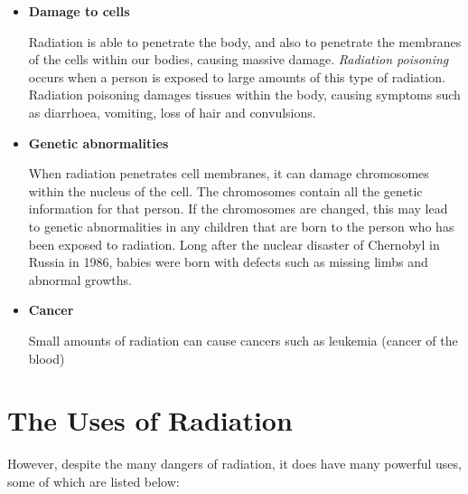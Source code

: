 \begin{itemize}
\item{\textbf{Damage to cells}}

Radiation is able to penetrate the body, and also to penetrate the membranes of the cells within our bodies, causing massive damage. \textit{Radiation poisoning} occurs when a person is exposed to large amounts of this type of radiation. Radiation poisoning damages tissues within the body, causing symptoms such as diarrhoea, vomiting, loss of hair and convulsions.

\item{\textbf{Genetic abnormalities}}

When radiation penetrates cell membranes, it can damage chromosomes within the nucleus of the cell. The chromosomes contain all the genetic information for that person. If the chromosomes are changed, this may lead to genetic abnormalities in any children that are born to the person who has been exposed to radiation. Long after the nuclear disaster of Chernobyl in Russia in 1986, babies were born with defects such as missing limbs and abnormal growths.

\item{\textbf{Cancer}}

Small amounts of radiation can cause cancers such as leukemia (cancer of the blood)

\end{itemize}






\section{The Uses of Radiation}
\label{sec:an:uses}

However, despite the many dangers of radiation, it does have many powerful uses, some of which are listed below:

